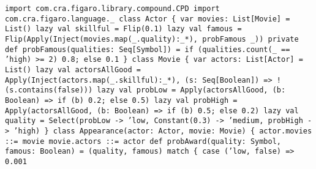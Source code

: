 \begin{flushleft}
\texttt{import com.cra.figaro.library.compound.CPD
\newline import com.cra.figaro.language.\_
\newline 
\newline class Actor \{
\newline \tab var movies: List[Movie] = List()
\newline \tab lazy val skillful = Flip(0.1)
\newline \tab lazy val famous =
\newline \tab Flip(Apply(Inject(movies.map(\_.quality):\_*), probFamous \_))
\newline \tab private def probFamous(qualities: Seq[Symbol]) =
\newline \tab if (qualities.count(\_ == 'high) >= 2) 0.8; else 0.1
\newline \}
\newline 
\newline class Movie \{
\newline \tab var actors: List[Actor] = List()
\newline \tab lazy val actorsAllGood = Apply(Inject(actors.map(\_.skillful):\_*), (s: Seq[Boolean]) => !(s.contains(false)))
\newline lazy val probLow = 
\newline Apply(actorsAllGood, (b: Boolean) => if (b) 0.2; else 0.5)
\newline lazy val probHigh = 
\newline Apply(actorsAllGood, (b: Boolean) => if (b) 0.5; else 0.2)
\newline lazy val quality = 
\newline Select(probLow -> 'low, Constant(0.3) -> 'medium, probHigh -> 'high)
\newline \}
\newline 
\newline class Appearance(actor: Actor, movie: Movie) \{
\newline \tab actor.movies ::= movie
\newline \tab movie.actors ::= actor
\newline 
\newline \tab def probAward(quality: Symbol, famous: Boolean) =
\newline \tab \tab (quality, famous) match \{
\newline \tab \tab case ('low, false) => 0.001
}
\end{flushleft}
